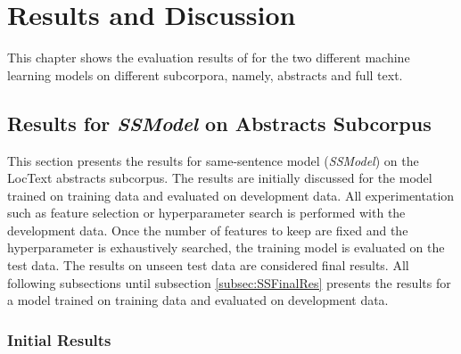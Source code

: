 \chapter{Results and Discussion}\label{chapter:results}

This chapter shows the evaluation results of for the two different machine learning models on different subcorpora, namely, abstracts and full text.

\section{Results for \textit{SSModel} on Abstracts Subcorpus}

This section presents the results for same-sentence model (\textit{SSModel}) on the LocText abstracts subcorpus. The results are initially discussed for the model trained on training data and evaluated on development data. All experimentation such as feature selection or hyperparameter search is performed with the development data. Once the number of features to keep are fixed and the hyperparameter is exhaustively searched, the training model is evaluated on the test data. The results on unseen test data are considered final results. All following subsections until subsection \ref{subsec:SSFinalRes} presents the results for a model trained on training data and evaluated on development data.


\subsection{Initial Results}

